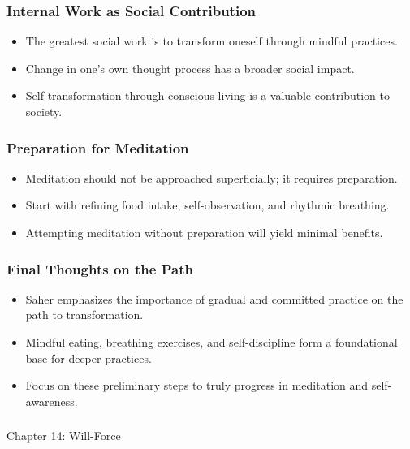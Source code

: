 \begin{frame}[fragile]\frametitle{Internal Work as Social Contribution}
    \begin{itemize}
        \item The greatest social work is to transform oneself through mindful practices.
        \item Change in one's own thought process has a broader social impact.
        \item Self-transformation through conscious living is a valuable contribution to society.
    \end{itemize}
\end{frame}

\begin{frame}[fragile]\frametitle{Preparation for Meditation}
    \begin{itemize}
        \item Meditation should not be approached superficially; it requires preparation.
        \item Start with refining food intake, self-observation, and rhythmic breathing.
        \item Attempting meditation without preparation will yield minimal benefits.
    \end{itemize}
\end{frame}

\begin{frame}[fragile]\frametitle{Final Thoughts on the Path}
    \begin{itemize}
        \item Saher emphasizes the importance of gradual and committed practice on the path to transformation.
        \item Mindful eating, breathing exercises, and self-discipline form a foundational base for deeper practices.
        \item Focus on these preliminary steps to truly progress in meditation and self-awareness.
    \end{itemize}
\end{frame}


\begin{frame}[fragile]\frametitle{}
\begin{center}
{\Large Chapter 14: Will-Force }
\end{center}
\end{frame}

